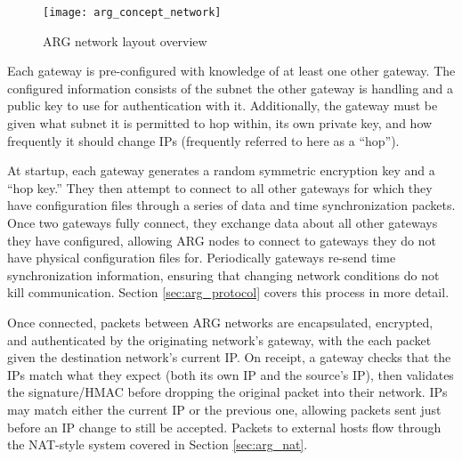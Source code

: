 \begin{figure}
	\centering
	\texttt{[image: arg\_concept\_network]}
	\caption{ARG network layout overview}
	\label{fig:argnetwork}
\end{figure}

\par Each gateway is pre-configured with knowledge of at least one other gateway. The configured information consists of the subnet the other gateway is handling and a public key to use for authentication with it. Additionally, the gateway must be given what subnet it is permitted to hop within, its own private key, and how frequently it should change IPs (frequently referred to here as a ``hop'').

\par At startup, each gateway generates a random symmetric encryption key and a ``hop key.'' They then attempt to connect to all other gateways for which they have configuration files through a series of data and time synchronization packets. Once two gateways fully connect, they exchange data about all other gateways they have configured, allowing ARG nodes to connect to gateways they do not have physical configuration files for. Periodically gateways re-send time synchronization information, ensuring that changing network conditions do not kill communication. Section \ref{sec:arg_protocol} covers this process in more detail.

\par Once connected, packets between ARG networks are encapsulated, encrypted, and authenticated by the originating network's gateway, with the each packet given the destination network's current IP. On receipt, a gateway checks that the IPs match what they expect (both its own IP and the source's IP), then validates the signature/\ac{HMAC} before dropping the original packet into their network. \acp{IP} may match either the current \ac{IP} or the previous one, allowing packets sent just before an \ac{IP} change to still be accepted. Packets to external hosts flow through the \ac{NAT}-style system covered in Section \ref{sec:arg_nat}. %


